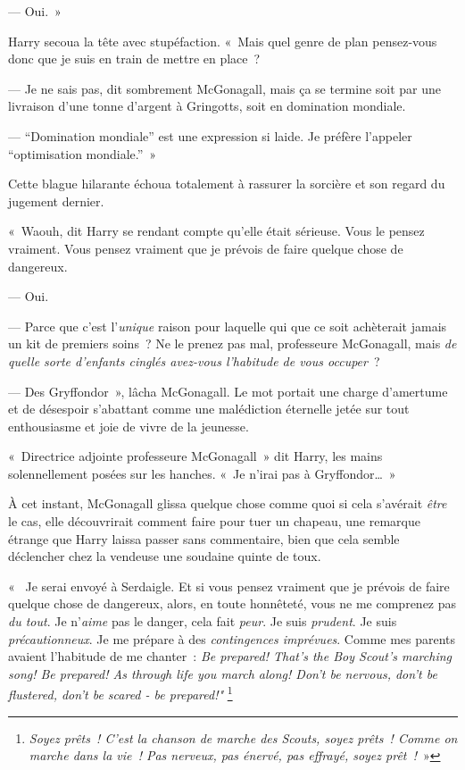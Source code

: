 --- Oui.~»

Harry secoua la tête avec stupéfaction. «~Mais quel genre de plan pensez-vous donc que je suis en train de mettre en place~?


--- Je ne sais pas, dit sombrement McGonagall, mais ça se termine soit par une livraison d'une tonne d'argent à Gringotts, soit en domination mondiale.

--- “Domination mondiale” est une expression si laide. Je préfère l'appeler “optimisation mondiale.”~»

Cette blague hilarante échoua totalement à rassurer la sorcière et son regard du jugement dernier.

«~Waouh, dit Harry se rendant compte qu'elle était sérieuse. Vous le pensez vraiment. Vous pensez vraiment que je prévois de faire quelque chose de dangereux.

--- Oui.

--- Parce que c'est l'\emph{unique} raison pour laquelle qui que ce soit achèterait jamais un kit de premiers soins~?
Ne le prenez pas mal, professeure McGonagall, mais \emph{de quelle sorte d'enfants cinglés avez-vous l'habitude de vous occuper}~?

--- Des Gryffondor~», lâcha McGonagall. Le mot portait une charge d'amertume et de désespoir s'abattant comme une malédiction éternelle jetée sur tout enthousiasme et joie de vivre de la jeunesse.

«~Directrice adjointe professeure McGonagall~» dit Harry, les mains solennellement posées sur les hanches. «~Je n'irai pas à Gryffondor…~»

À cet instant, McGonagall glissa quelque chose comme quoi si cela s'avérait \emph{être} le cas, elle découvrirait comment faire pour tuer un chapeau, une remarque étrange que Harry laissa passer sans commentaire, bien que cela semble déclencher chez la vendeuse une soudaine quinte de toux.

«~ Je serai envoyé à Serdaigle. Et si vous pensez vraiment que je prévois de faire quelque chose de dangereux, alors, en toute honnêteté, vous ne me comprenez pas \emph{du tout}.
Je n'\emph{aime} pas le danger, cela fait \emph{peur}.  Je suis \emph{prudent}.  Je suis \emph{précautionneux}. Je me prépare à des \emph{contingences imprévues}.
Comme mes parents avaient l'habitude de me chanter~:
\emph{Be prepared! That's the Boy Scout's marching song! Be prepared! As through life you march along! Don't be nervous, don't be flustered, don't be scared - be prepared!"}
\footnote{\emph{Soyez prêts~! C'est la chanson de marche des Scouts, soyez prêts~! Comme on marche dans la vie~! Pas nerveux, pas énervé, pas effrayé, soyez prêt~!}~»}

